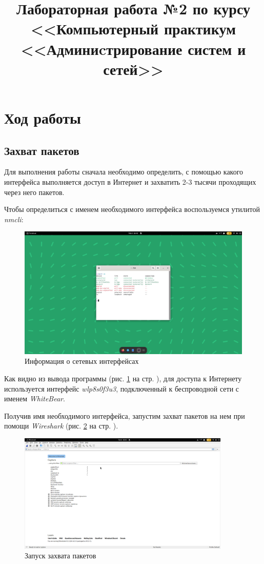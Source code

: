 \documentclass[a4paper]{article}
\title{
  Лабораторная работа №2 по курсу \\
  <<Компьютерный практикум <<Админиcтрирование систем и сетей>>  
}
\begin{document}
  \templatedtitlepage
  
  \toc
  \section{Ход работы}

  \subsection{Захват пакетов}

  Для выполнения работы сначала необходимо определить, с помощью какого интерфейса выполняется
  доступ в Интернет и захватить 2-3 тысячи проходящих через него пакетов.
  
  Чтобы определиться с именем необходимого интерфейса воспользуемся утилитой \textit{nmcli}:
    
  \begin{figure}[H]
    \centering
    \includegraphics[width=1.0\textwidth]{02_0001}
    \caption{Информация о сетевых интерфейсах}
    \label{img:0001}
  \end{figure}

  Как видно из вывода программы (рис. \ref{img:0001} на стр. \pageref{img:0001}), для 
  доступа к Интернету используется интерфейс \textit{wlp8s0f3u3}, подключенный 
  к беспроводной сети с именем \textit{WhiteBear}.

  Получив имя необходимого интерфейса, запустим захват пакетов на нем при помощи
  \textit{Wireshark} (рис. \ref{img:0002} на стр. \pageref{img:0002}).

  \begin{figure}[H]
    \centering
    \includegraphics[width=0.9\textwidth]{02_0002}
    \caption{Запуск захвата пакетов}
    \label{img:0002}
  \end{figure}
\end{document}

